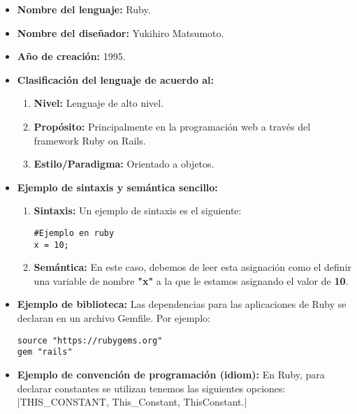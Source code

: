\documentclass[11pt,letterpaper]{article}
\begin{document}
\begin{enumerate}
\begin{itemize}
\begin{itemize}
                \end{itemize}
                \begin{itemize}
                  \item \textbf{Nombre del lenguaje:} Ruby.
                  \item \textbf{Nombre del diseñador:} Yukihiro Matsumoto.
                  \item \textbf{Año de creación:} 1995.
                  \item \textbf{Clasificación del lenguaje de acuerdo al:}
                        \begin{enumerate}
                          \item \textbf{Nivel:} Lenguaje de alto nivel.
                          \item \textbf{Propósito:} Principalmente en la
                                programación web a través del framework Ruby on
                                Rails.
                          \item \textbf{Estilo/Paradigma:} Orientado a objetos.
                        \end{enumerate}
                  \item \textbf{Ejemplo de sintaxis y semántica sencillo:}
                        \begin{enumerate}
                          \item \textbf{Sintaxis:} Un ejemplo de sintaxis es el
                                siguiente:
\begin{verbatim}
#Ejemplo en ruby
x = 10;
\end{verbatim}
                          \item \textbf{Semántica:} En este caso, debemos de
                                leer esta asignación como el definir una
                                variable de nombre \textbf{"x"} a la que le
                                estamos asignando el valor de \textbf{10}.
                        \end{enumerate}
                  \item \textbf{Ejemplo de biblioteca:} Las dependencias para
                        las aplicaciones de Ruby se declaran en un archivo
                        Gemfile. Por ejemplo:
\begin{verbatim}
source "https://rubygems.org"
gem "rails"
\end{verbatim}

                  \item \textbf{Ejemplo de convención de programación (idiom):}
                        En Ruby, para declarar constantes se utilizan tenemos
                        las siguientes opciones:
                        |THIS\_CONSTANT, This\_Constant, ThisConstant.|
                \end{itemize}
        \end{itemize}


\end{enumerate}
\end{document}

